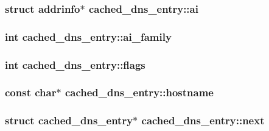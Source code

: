 \subsubsection[{ai}]{\setlength{\rightskip}{0pt plus 5cm}struct addrinfo$\ast$ cached\+\_\+dns\+\_\+entry\+::ai}\label{structcached__dns__entry_a8881ad4c8fb134be0f07d45e76336476}
\hypertarget{structcached__dns__entry_a47cd1861b13d948c3ebb0ba1ff4b3c01}{}
\subsubsection[{ai\+\_\+family}]{\setlength{\rightskip}{0pt plus 5cm}int cached\+\_\+dns\+\_\+entry\+::ai\+\_\+family}\label{structcached__dns__entry_a47cd1861b13d948c3ebb0ba1ff4b3c01}
\hypertarget{structcached__dns__entry_a5878e9423d88197a39de9fd88209553a}{}
\subsubsection[{flags}]{\setlength{\rightskip}{0pt plus 5cm}int cached\+\_\+dns\+\_\+entry\+::flags}\label{structcached__dns__entry_a5878e9423d88197a39de9fd88209553a}
\hypertarget{structcached__dns__entry_a052fed87e08c62b9af51882c1f45188d}{}
\subsubsection[{hostname}]{\setlength{\rightskip}{0pt plus 5cm}const char$\ast$ cached\+\_\+dns\+\_\+entry\+::hostname}\label{structcached__dns__entry_a052fed87e08c62b9af51882c1f45188d}
\hypertarget{structcached__dns__entry_a93565db3d9426f615031c51b6046d7df}{}
\subsubsection[{next}]{\setlength{\rightskip}{0pt plus 5cm}struct {\bf cached\+\_\+dns\+\_\+entry}$\ast$ cached\+\_\+dns\+\_\+entry\+::next}\label{structcached__dns__entry_a93565db3d9426f615031c51b6046d7df}
\hypertarget{structcached__dns__entry_a57e20fe1ffaf4e0962cf008e13fb0dc1}{}
